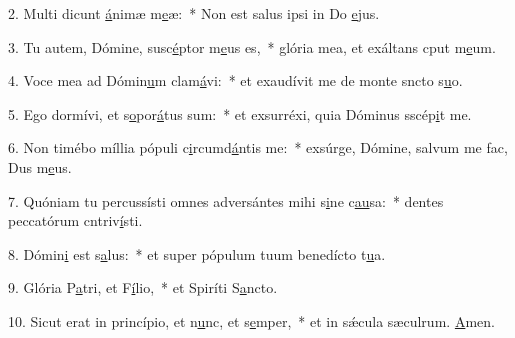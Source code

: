 2. Multi dicunt \uline{á}nimæ m\uline{e}æ:~* Non est salus ipsi in Do \uline{e}jus.\par 
3. Tu autem, Dómine, susc\uline{é}ptor m\uline{e}us es,~* glória mea, et exáltans cput m\uline{e}um.\par 
4. Voce mea ad Dómin\uline{u}m clam\uline{á}vi:~* et exaudívit me de monte sncto s\uline{u}o.\par 
5. Ego dormívi, et s\uline{o}por\uline{á}tus sum:~* et exsurréxi, quia Dóminus sscép\uline{i}t me.\par 
6. Non timébo míllia pópuli c\uline{i}rcumd\uline{á}ntis me:~* exsúrge, Dómine, salvum me fac, Dus m\uline{e}us.\par 
7. Quóniam tu percussísti omnes adversántes mihi s\uline{i}ne c\uline{au}sa:~* dentes peccatórum cntriv\uline{í}sti.\par 
8. Dómin\uline{i} est s\uline{a}lus:~* et super pópulum tuum benedícto t\uline{u}a.\par 
9. Glória P\uline{a}tri, et F\uline{í}lio,~* et Spiríti S\uline{a}ncto.\par 
10. Sicut erat in princípio, et n\uline{u}nc, et s\uline{e}mper,~* et in sǽcula sæculrum. \uline{A}men.\par 
